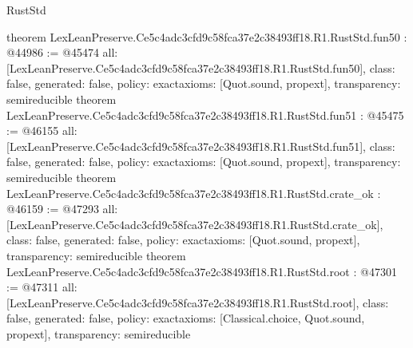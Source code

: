 \begin{lexlean}{RustStd}
\begin{coremodule}
{}
theorem LexLeanPreserve.Ce5c4adc3cfd9c58fca37e2c38493ff18.R1.RustStd.fun50 : @44986 := @45474 {
  all: [LexLeanPreserve.Ce5c4adc3cfd9c58fca37e2c38493ff18.R1.RustStd.fun50],
  class: false,
  generated: false,
  policy: exact{axioms: [Quot.sound, propext]},
  transparency: semireducible
}
theorem LexLeanPreserve.Ce5c4adc3cfd9c58fca37e2c38493ff18.R1.RustStd.fun51 : @45475 := @46155 {
  all: [LexLeanPreserve.Ce5c4adc3cfd9c58fca37e2c38493ff18.R1.RustStd.fun51],
  class: false,
  generated: false,
  policy: exact{axioms: [Quot.sound, propext]},
  transparency: semireducible
}
theorem LexLeanPreserve.Ce5c4adc3cfd9c58fca37e2c38493ff18.R1.RustStd.crate_ok : @46159 := @47293 {
  all: [LexLeanPreserve.Ce5c4adc3cfd9c58fca37e2c38493ff18.R1.RustStd.crate_ok],
  class: false,
  generated: false,
  policy: exact{axioms: [Quot.sound, propext]},
  transparency: semireducible
}
theorem LexLeanPreserve.Ce5c4adc3cfd9c58fca37e2c38493ff18.R1.RustStd.root : @47301 := @47311 {
  all: [LexLeanPreserve.Ce5c4adc3cfd9c58fca37e2c38493ff18.R1.RustStd.root],
  class: false,
  generated: false,
  policy: exact{axioms: [Classical.choice, Quot.sound, propext]},
  transparency: semireducible
}


\end{coremodule}
\end{lexlean}
